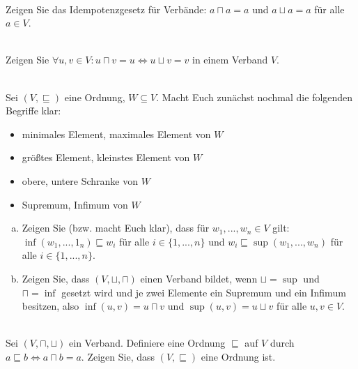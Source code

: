 \\
Zeigen Sie das Idempotenzgesetz für Verbände: $a \sqcap a = a$ und $a \sqcup a = a$ für alle $a \in V$.

\\
Zeigen Sie $\forall u,v\in V: u\sqcap v = u \Leftrightarrow u\sqcup v = v$ in einem Verband $V$.

\\
Sei $(V,\sqsubseteq)$ eine Ordnung, $W\subseteq V$. Macht Euch zunächst nochmal die folgenden Begriffe klar:
\begin{itemize}
  \item minimales Element, maximales Element von $W$
  \item größtes Element, kleinstes Element von $W$
  \item obere, untere Schranke von $W$
  \item Supremum, Infimum von $W$
\end{itemize}
\begin{enumerate}[a)]
  \item Zeigen Sie (bzw. macht Euch klar), dass für $w_1,...,w_n\in V$ gilt: $\inf(w_1,...,1_n)\sqsubseteq w_i$ für alle $i\in\{1,...,n\}$ und $w_i\sqsubseteq \sup(w_1,...,w_n)$ für alle $i\in\{1,...,n\}$.
  \item Zeigen Sie, dass $(V,\sqcup,\sqcap)$ einen Verband bildet, wenn $\sqcup=\sup$ und $\sqcap=\inf$ gesetzt wird und je zwei Elemente ein Supremum und ein Infimum besitzen, also $\inf(u,v)=u\sqcap v$ und $\sup(u,v)=u\sqcup v$ für alle $u,v\in V$.
\end{enumerate}

\\
Sei $(V,\sqcap,\sqcup)$ ein Verband. Definiere eine Ordnung $\sqsubseteq$ auf $V$ durch $a\sqsubseteq b \Leftrightarrow a\sqcap b = a$. Zeigen Sie, dass $(V,\sqsubseteq)$ eine Ordnung ist.


